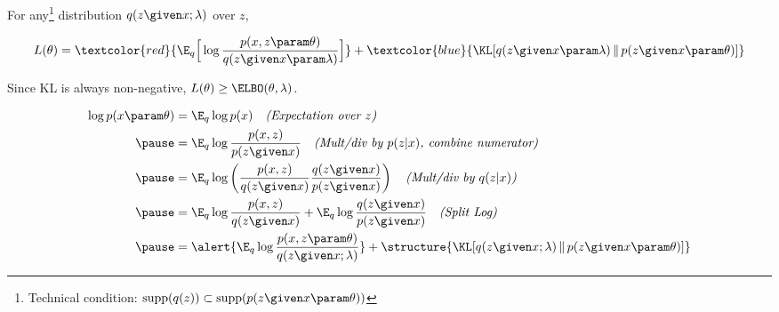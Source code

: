 \begin{frame}

For any\footnote{Technical condition: $\text{supp}(q(z)) \subset \text{supp}(p(z \given x \param \theta))$} distribution $q(z\given x; \lambda)$ over $z$, 

\[ L(\theta) = \textcolor{red}{\E_{q}\Big[\log \frac{p(x, z \param \theta)}{q(z\given x \param\lambda)} \Big]} + \textcolor{blue}{\KL[q(z\given x \param \lambda)  \, \Vert \, p(z \given x \param \theta)]}\] 

\begin{center}
\end{center}


Since KL is always non-negative, $L(\theta) \geq \ELBO(\theta, \lambda)$. 
\end{frame}

\begin{frame}
{
\begin{align*}
\log p(x \param \theta) &=\E_{q} \log p(x)  \quad  \text{\it (Expectation over $z$)} \\ \pause
&= \E_{q} \log \frac{p(x, z)}{p(z \given x)} \quad \text{\it (Mult/div by $p(z|x)$, combine numerator)}\\ \pause
&= \E_{q} \log \left( \frac{p(x, z )}{q(z\given x)} \frac{q(z\given x)}{p(z \given x)} \right) \quad \text{\it (Mult/div by $q(z|x)$)}\\ \pause
&= \E_{q} \log \frac{p(x, z )}{q(z\given x )}  + \E_{q}  \log \frac{q(z \given x)}{p(z \given x )}  \quad  \text{\it (Split Log)}\\ \pause
&= \alert{\E_{q}  \log \frac{p(x, z \param \theta)}{q(z\given x;\lambda )}} + \structure{\KL[q(z \given x;\lambda)  \, \Vert \, p(z \given x \param \theta)]}  \\
\end{align*}
}
\end{frame}


